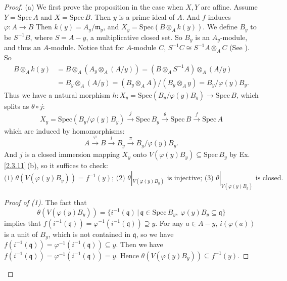 \documentclass[12pt]{amsart}
\begin{document}
\begin{proof}
	(a) We first prove the proposition in the case when $X,Y$ are affine. Assume $Y=\mathrm{Spec}\, A$ and $X=\mathrm{Spec}\, B$. Then $y$ is a prime ideal of $A$. And $f$ induces $\varphi: A\rightarrow B$
	Then $k(y)=A_y/\mathfrak{m}_y$, and $X_y=\mathrm{Spec}(B\otimes_Ak(y))$. We define $B_y$ to be $S^{-1}B$, where
	$S=A-y$, a multiplicative closed set. So $B_y$ is an $A_y$-module, and thus an $A$-module. Notice that for $A$-module $C$, $S^{-1}C\cong S^{-1}A\otimes_AC$ (See \cite[Chapter 3, Proposition 3.5, P. 39]{ATIY}).
	So
	\begin{align*}
	B\otimes_Ak(y)&=B\otimes_A(A_y\otimes_A(A/y))=(B\otimes_AS^{-1}A)\otimes_A(A/y)\\
	&=B_y\otimes_A (A/y)=(B_y\otimes_AA)/(B_y\otimes_Ay)=B_y/\varphi(y)B_y.
	\end{align*}
	Thus we have a natural morphism $h:X_y=\mathrm{Spec}(B_y/\varphi(y)B_y)\rightarrow\mathrm{Spec}\, B$, which splits as $\theta\circ j$: 
	$$
	X_y=\mathrm{Spec}(B_y/\varphi(y)B_y)\xrightarrow[]{j}\mathrm{Spec}\, B_y\xrightarrow[]{\theta} \mathrm{Spec}\, B\xrightarrow[]{f} \mathrm{Spec}\,A 
	$$
	which are induced by homomorphisms: 
	$$
	A\xrightarrow[]{\varphi}B\xrightarrow[]{i}B_y\xrightarrow[]{\pi}   B_y/\varphi(y)B_y.
	$$
	And $j$ is a closed immersion mapping $X_y$ onto $V(\varphi(y)B_y)\subseteq\mathrm{Spec}\,B_y$ by Ex. \ref{2.3.11}\,(b), so it suffices to check:
	$$\text{(1) }\theta(V(\varphi (y)B_y))=f^{-1}(y)\text{; \ (2) }\theta|_{V(\varphi(y)B_y)}\text{ is injective; \ (3) }\theta|_{V(\varphi(y)B_y)}\text{ is closed.}$$
	\begin{proof}[Proof of (1)]
		The fact that $$\theta(V(\varphi(y)B_y))=\{i^{-1}(\mathfrak{q})\,|\,\mathfrak{q}\in \mathrm{Spec}\, B_y,\ \varphi(y)B_y\subseteq \mathfrak{q}\}$$ implies that $f(i^{-1}(\mathfrak{q}))=\varphi^{-1}(i^{-1}(\mathfrak{q}))\supseteq y$. For any $a\in A-y$,
		$i(\varphi(a))$ is a unit of $B_y$, which is not contained in $\mathfrak{q}$, so we have $f(i^{-1}(\mathfrak{q}))=\varphi^{-1}(i^{-1}(\mathfrak{q}))\subseteq y$. Then we have $f(i^{-1}(\mathfrak{q}))=\varphi^{-1}(i^{-1}(\mathfrak{q}))= y$. Hence $\theta(V(\varphi (y)B_y))\subseteq f^{-1}(y)$.
		

\end{proof}
\end{proof}
\end{document}
